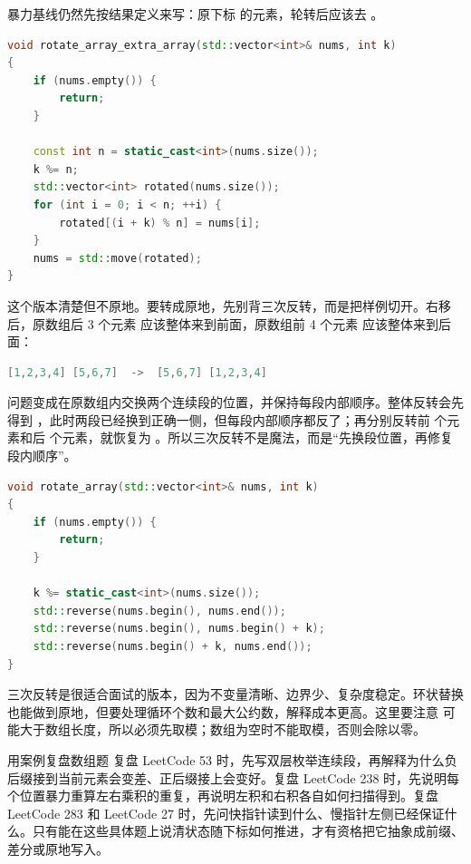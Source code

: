 暴力基线仍然先按结果定义来写：原下标  的元素，轮转后应该去 。

\begin{lstlisting}[language=C++,caption={LeetCode 189 轮转数组：额外数组基线}]
void rotate_array_extra_array(std::vector<int>& nums, int k)
{
    if (nums.empty()) {
        return;
    }

    const int n = static_cast<int>(nums.size());
    k %= n;
    std::vector<int> rotated(nums.size());
    for (int i = 0; i < n; ++i) {
        rotated[(i + k) % n] = nums[i];
    }
    nums = std::move(rotated);
}
\end{lstlisting}

这个版本清楚但不原地。要转成原地，先别背三次反转，而是把样例切开。右移  后，原数组后 3 个元素 \code{[5,6,7]} 应该整体来到前面，原数组前 4 个元素 \code{[1,2,3,4]} 应该整体来到后面：

\begin{lstlisting}[language=C++]
[1,2,3,4] [5,6,7]  ->  [5,6,7] [1,2,3,4]
\end{lstlisting}

问题变成在原数组内交换两个连续段的位置，并保持每段内部顺序。整体反转会先得到 \code{[7,6,5,4,3,2,1]}，此时两段已经换到正确一侧，但每段内部顺序都反了；再分别反转前  个元素和后  个元素，就恢复为 \code{[5,6,7,1,2,3,4]}。所以三次反转不是魔法，而是“先换段位置，再修复段内顺序”。

\begin{lstlisting}[language=C++,caption={LeetCode 189 轮转数组：三次反转}]
void rotate_array(std::vector<int>& nums, int k)
{
    if (nums.empty()) {
        return;
    }

    k %= static_cast<int>(nums.size());
    std::reverse(nums.begin(), nums.end());
    std::reverse(nums.begin(), nums.begin() + k);
    std::reverse(nums.begin() + k, nums.end());
}
\end{lstlisting}

三次反转是很适合面试的版本，因为不变量清晰、边界少、复杂度稳定。环状替换也能做到原地，但要处理循环个数和最大公约数，解释成本更高。这里要注意  可能大于数组长度，所以必须先取模；数组为空时不能取模，否则会除以零。

\begin{principlebox}{用案例复盘数组题}
复盘 LeetCode 53 时，先写双层枚举连续段，再解释为什么负后缀接到当前元素会变差、正后缀接上会变好。复盘 LeetCode 238 时，先说明每个位置暴力重算左右乘积的重复，再说明左积和右积各自如何扫描得到。复盘 LeetCode 283 和 LeetCode 27 时，先问快指针读到什么、慢指针左侧已经保证什么。只有能在这些具体题上说清状态随下标如何推进，才有资格把它抽象成前缀、差分或原地写入。
\end{principlebox}

